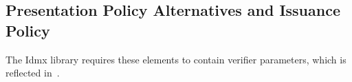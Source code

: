 \subsection{Presentation Policy Alternatives and Issuance Policy}

The Idmx library requires these elements to contain verifier parameters, which is reflected 
in~\cite{abc4trust:h22}.



% 


